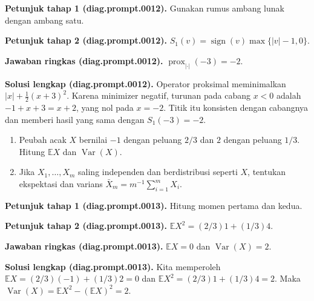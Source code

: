 \par\noindent\textbf{Petunjuk tahap 1 (diag.prompt.0012).}
Gunakan rumus ambang lunak dengan ambang satu.
\label{orig03:diag:hint1:0012}
\par\noindent\textbf{Petunjuk tahap 2 (diag.prompt.0012).}
$S_1(v)=\operatorname{sign}(v)\max\{|v|-1,0\}$.
\label{orig03:diag:hint2:0012}
\par\noindent\textbf{Jawaban ringkas (diag.prompt.0012).}
$\operatorname{prox}_{|\cdot|}(-3)=-2$.
\label{orig03:diag:answer:0012}
\par\noindent\textbf{Solusi lengkap (diag.prompt.0012).}
Operator proksimal meminimalkan $|x|+\tfrac12(x+3)^2$. Karena minimizer
negatif, turunan pada cabang $x<0$ adalah $-1+x+3=x+2$, yang nol pada
$x=-2$. Titik itu konsisten dengan cabangnya dan memberi hasil yang sama
dengan $S_1(-3)=-2$.
\label{orig03:diag:solution:0012}

\begin{exercise}
\label{orig03:diag:problem:0007}
\begin{enumerate}
\item\label{orig03:diag:prompt:0013}
Peubah acak $X$ bernilai $-1$ dengan peluang $2/3$ dan $2$ dengan peluang
$1/3$. Hitung $\mathbb{E}X$ dan $\operatorname{Var}(X)$.
\item\label{orig03:diag:prompt:0014}
Jika $X_1,\dots,X_m$ saling independen dan berdistribusi seperti $X$, tentukan
ekspektasi dan varians $\bar X_m=m^{-1}\sum_{i=1}^mX_i$.
\end{enumerate}
\end{exercise}

\par\noindent\textbf{Petunjuk tahap 1 (diag.prompt.0013).}
Hitung momen pertama dan kedua.
\label{orig03:diag:hint1:0013}
\par\noindent\textbf{Petunjuk tahap 2 (diag.prompt.0013).}
$\mathbb{E}X^2=(2/3)1+(1/3)4$.
\label{orig03:diag:hint2:0013}
\par\noindent\textbf{Jawaban ringkas (diag.prompt.0013).}
$\mathbb{E}X=0$ dan $\operatorname{Var}(X)=2$.
\label{orig03:diag:answer:0013}
\par\noindent\textbf{Solusi lengkap (diag.prompt.0013).}
Kita memperoleh
$\mathbb{E}X=(2/3)(-1)+(1/3)2=0$ dan
$\mathbb{E}X^2=(2/3)1+(1/3)4=2$. Maka
$\operatorname{Var}(X)=\mathbb{E}X^2-(\mathbb{E}X)^2=2$.
\label{orig03:diag:solution:0013}

